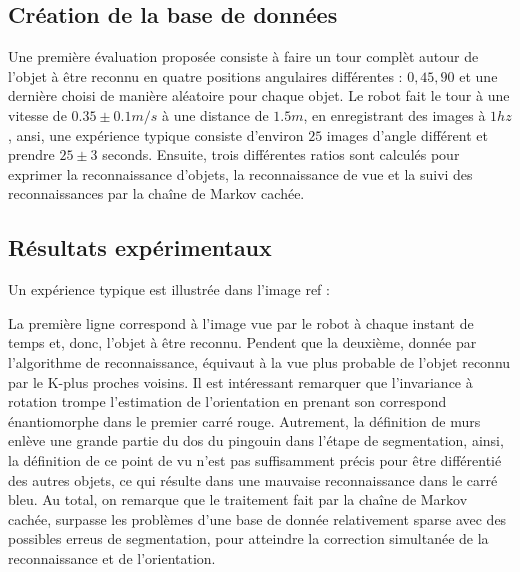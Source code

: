 \subsection {Création de la base de données}
Une première évaluation proposée consiste à faire un tour complèt autour de l'objet à être reconnu en quatre positions angulaires différentes : $0, 45, 90$ et une dernière choisi de manière aléatoire pour chaque objet. Le robot fait le tour à une vitesse de $0.35 \pm 0.1 m/s$ à une distance de $1.5m$, en enregistrant des images à $1hz$, ansi, une expérience typique consiste d'environ $25$  images d'angle différent et prendre $25 \pm 3$ seconds. Ensuite, trois différentes ratios sont calculés pour exprimer la reconnaissance d'objets, la reconnaissance de vue et la suivi des reconnaissances par la chaîne de Markov cachée.

\subsection{Résultats expérimentaux}

Un expérience typique est illustrée dans l'image {\color{green} ref} :

\begin{figure}[H]
\end{figure}

La première ligne correspond à l'image vue par le robot à chaque instant de temps et, donc, l'objet à être reconnu. Pendent que la deuxième, donnée par l'algorithme de reconnaissance, équivaut à la vue plus probable de l'objet reconnu par le K-plus proches voisins. Il est intéressant remarquer que l'invariance à rotation trompe l'estimation de l'orientation en prenant son correspond énantiomorphe dans le premier carré rouge. Autrement, la définition de murs enlève une grande partie du dos du pingouin dans l'étape de segmentation, ainsi, la définition de ce point de vu n'est pas suffisamment précis pour être différentié des autres objets, ce qui résulte dans une mauvaise reconnaissance dans le carré bleu. Au total, on remarque que le traitement fait par la chaîne de Markov cachée, surpasse les problèmes d'une base de donnée relativement sparse avec des possibles erreus de segmentation, pour atteindre la correction simultanée de la reconnaissance et de l'orientation. 

